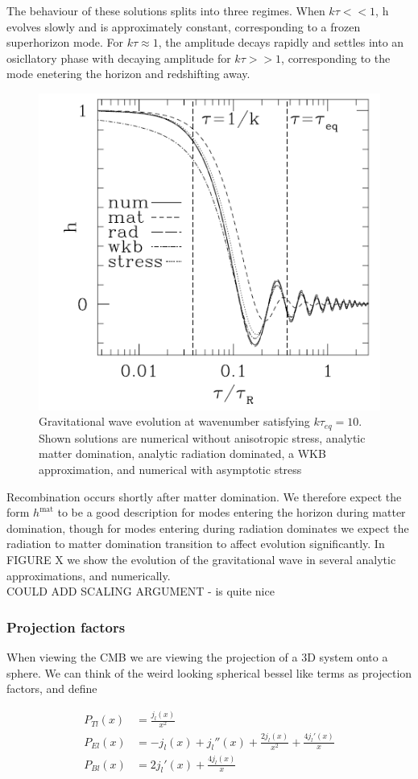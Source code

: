 \documentclass[a4paper,10pt]{article}
\begin{document}
The behaviour of these solutions splits into three regimes. When $k\tau<<1$, h evolves slowly and is approximately constant, corresponding to a frozen superhorizon mode. For $k\tau\approx1$, the amplitude decays rapidly and settles into an osicllatory phase with decaying amplitude for $k\tau>>1$, corresponding to the mode enetering the horizon and redshifting away. 

\begin{figure}[h]
  \includegraphics[width=0.5\linewidth]{gravwaveev.png}
  \centering
  \caption{Gravitational wave evolution at wavenumber satisfying $k\tau_{eq}=10$. Shown solutions are numerical without anisotropic stress, analytic matter domination, analytic radiation dominated, a WKB approximation, and numerical with asymptotic stress}
\end{figure}

Recombination occurs shortly after matter domination. We therefore expect the form $h^{\text{mat}}$ to be a good description for modes entering the horizon during matter domination, though for modes entering during radiation dominates we expect the radiation to matter domination transition to affect evolution significantly. In FIGURE X we show the evolution of the gravitational wave in several analytic approximations, and numerically.\\


COULD ADD SCALING ARGUMENT - is quite nice


\subsubsection{Projection factors}

When viewing the CMB we are viewing the projection of a 3D system onto a sphere. We can think of the weird looking spherical bessel like terms as projection factors, and define

\begin{align}
P_{Tl}(x) &= \frac{j_l(x)}{x^2}\\
P_{El}(x) &= -j_l(x) +j_l''(x)+\frac{2j_l(x)}{x^2} + \frac{4j_l'(x)}{x}\\
P_{Bl}(x) &= 2j_l'(x)+\frac{4j_l(x)}{x}
\end{align}
\end{document}
